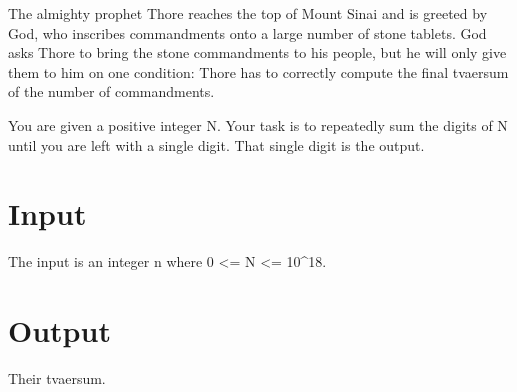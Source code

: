 

The almighty prophet Thore reaches the top of Mount Sinai and is greeted by God, who inscribes commandments onto a large number of stone tablets. God asks Thore to bring the stone commandments to his people, but he will only give them to him on one condition: Thore has to correctly compute the final tvaersum of the number of commandments.

You are given a positive integer N. Your task is to repeatedly sum the digits of N until you are left with a single digit. That single digit is the output.

\section*{Input}

The input is an integer n where 0 <= N <= 10^18.

\section*{Output}

Their tvaersum.
